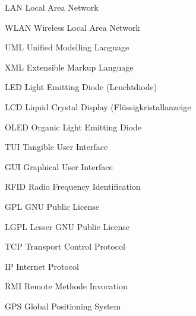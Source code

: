 {LAN}
{Local Area Network}

{WLAN}
{Wireless Local Area Network}

{UML}
{Unified Modelling Language}

{XML}
{Extensible Markup Language}

{LED}
{Light Emitting Diode (Leuchtdiode)}

{LCD}
{Liquid Crystal Display (Flüssigkristallanzeige}

{OLED}
{Organic Light Emitting Diode}

{TUI}
{Tangible User Interface}

{GUI}
{Graphical User Interface}

{RFID}
{Radio Frequency Identification}

{GPL}
{GNU Public License}

{LGPL}
{Lesser GNU Public License}

{TCP}
{Transport Control Protocol}

{IP}
{Internet Protocol}

{RMI}
{Remote Methode Invocation}

{GPS}
{Global Positioning System}
